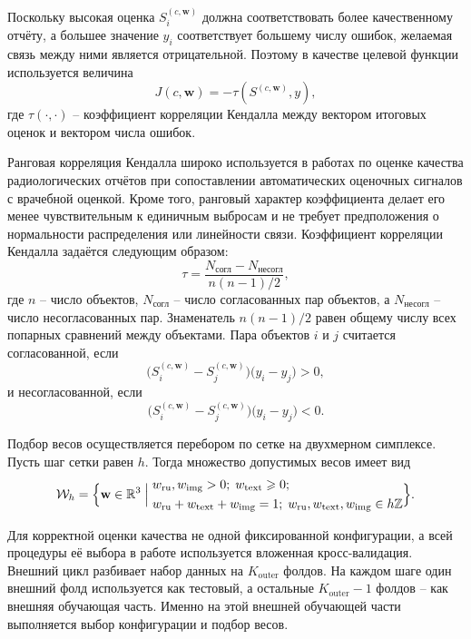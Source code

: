 Поскольку высокая оценка $S_i^{(c,\mathbf{w})}$ должна соответствовать более качественному отчёту, а большее значение $y_i$ соответствует большему числу ошибок, желаемая связь между ними является отрицательной. Поэтому в качестве целевой функции используется величина
\[
J(c,\mathbf{w}) = -\tau\!\left(S^{(c,\mathbf{w})}, y\right),
\]
где $\tau(\cdot,\cdot)$ -- коэффициент корреляции Кендалла между вектором итоговых оценок и вектором числа ошибок.

Ранговая корреляция Кендалла широко используется в работах по оценке качества радиологических отчётов при сопоставлении автоматических оценочных сигналов с врачебной оценкой. Кроме того, ранговый характер коэффициента делает его менее чувствительным к единичным выбросам и не требует предположения о нормальности распределения или линейности связи. Коэффициент корреляции Кендалла задаётся следующим образом:
\[
\tau =
\frac{N_{\text{согл}} - N_{\text{несогл}}}
{n(n-1)/2},
\]
где \(n\) -- число объектов, \(N_{\text{согл}}\) -- число согласованных пар объектов, а \(N_{\text{несогл}}\) -- число несогласованных пар. Знаменатель \(n(n-1)/2\) равен общему числу всех попарных сравнений между объектами. Пара объектов \(i\) и \(j\) считается согласованной, если
\[
\bigl(S_i^{(c,\mathbf{w})} - S_j^{(c,\mathbf{w})}\bigr)\bigl(y_i - y_j\bigr) > 0,
\]
и несогласованной, если
\[
\bigl(S_i^{(c,\mathbf{w})} - S_j^{(c,\mathbf{w})}\bigr)\bigl(y_i - y_j\bigr) < 0.
\]

Подбор весов осуществляется перебором по сетке на двухмерном симплексе. Пусть шаг сетки равен $h$. Тогда множество допустимых весов имеет вид
\[
\mathcal{W}_h =
\Bigl\{
\mathbf{w} \in \mathbb{R}^3
\Bigm|
\begin{aligned}
&w_{\mathrm{ru}}, w_{\mathrm{img}} > 0;\; w_{\mathrm{text}} \ge 0; \\
&w_{\mathrm{ru}} + w_{\mathrm{text}} + w_{\mathrm{img}} = 1;\;
w_{\mathrm{ru}}, w_{\mathrm{text}}, w_{\mathrm{img}} \in h\mathbb{Z}
\end{aligned}
\Bigr\}.
\]

Для корректной оценки качества не одной фиксированной конфигурации, а всей процедуры её выбора в работе используется вложенная кросс-валидация. Внешний цикл разбивает набор данных на $K_{\mathrm{outer}}$ фолдов. На каждом шаге один внешний фолд используется как тестовый, а остальные $K_{\mathrm{outer}}-1$ фолдов -- как внешняя обучающая часть. Именно на этой внешней обучающей части выполняется выбор конфигурации и подбор весов.

